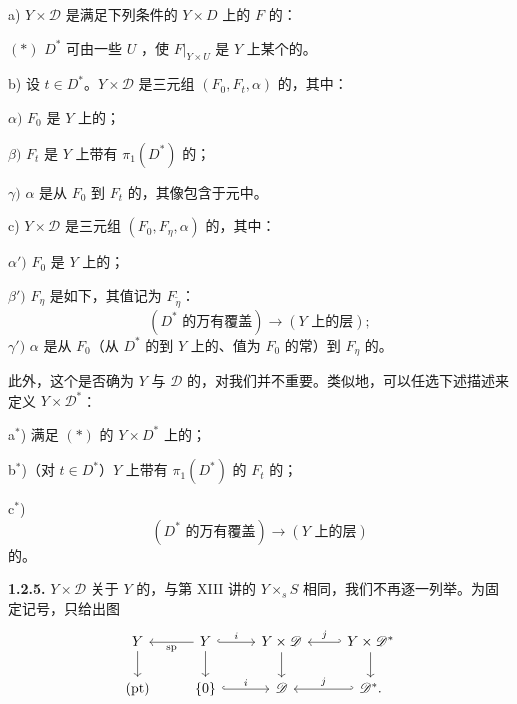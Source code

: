  a) $Y\times\mathscr D$ 是满足下列条件的 $Y\times D$ 上的 $F$ 的：

 $(*)$ $D^*$ 可由一些 $U$ ，使 $F|_{Y\times U}$ 是 $Y$ 上某个的。

 b) 设 $t\in D^*$。$Y\times\mathscr D$ 是三元组 $(F_0,F_t,\alpha)$ 的，其中：

 $\alpha)$ $F_0$ 是 $Y$ 上的；

 $\beta)$ $F_t$ 是 $Y$ 上带有 $\pi_1(D^*)$ 的；

 $\gamma)$ $\alpha$ 是从 $F_0$ 到 $F_t$ 的，其像包含于元中。

 c) $Y\times\mathscr D$ 是三元组 $(F_0,F_\eta,\alpha)$ 的，其中：

 $\alpha')$ $F_0$ 是 $Y$ 上的；

 $\beta')$ $F_\eta$ 是如下，其值记为 $F_{\widetilde\eta}$：
\[
 (D^*\text{ 的万有覆盖})\longrightarrow(Y\text{ 上的层});
\]
 $\gamma')$ $\alpha$ 是从 $F_0$（从 $D^*$ 的到 $Y$ 上的、值为 $F_0$ 的常）到 $F_\eta$ 的。

此外，这个是否确为 $Y$ 与 $\mathscr D$ 的，对我们并不重要。类似地，可以任选下述描述来定义 $Y\times\mathscr D^*$：

 a$^*$) 满足 $(*)$ 的 $Y\times D^*$ 上的；

 b$^*$)（对 $t\in D^*$）$Y$ 上带有 $\pi_1(D^*)$ 的 $F_t$ 的；

 c$^*$) 
\[
 (D^*\text{ 的万有覆盖})\longrightarrow(Y\text{ 上的层})
\]
的。

\textbf{1.2.5.}  $Y\times\mathscr D$ 关于 $Y$ 的，与第 XIII 讲的 $Y\times_s S$ 相同，我们不再逐一列举。为固定记号，只给出图
\[
\begin{tikzcd}
Y\arrow[d]&Y\arrow[l,"\mathrm{sp}"]\arrow[r,hook,"i"]\arrow[d]&Y\times\mathscr D\arrow[d]&Y\times\mathscr D^*\arrow[l,hook',"j"']\arrow[d]\\
(\mathrm{pt})&\{0\}\arrow[r,hook,"i"]&\mathscr D&\mathscr D^*\arrow[l,hook',"j"'].
\end{tikzcd}
\]

